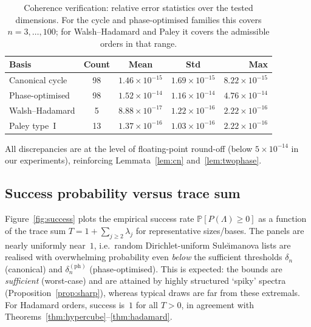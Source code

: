 \documentclass[12pt,fleqn]{amsart}
\renewcommand{\ge}{\geqslant}
\theoremstyle{definition}
\theoremstyle{remark}
\newcommand{\1}{\mathbf{1}}
\begin{document}
\begin{table}[h]
\centering
\caption{Coherence verification: relative error statistics over the tested dimensions. For the cycle and phase-optimised families this covers $n=3,\ldots,100$; for Walsh--Hadamard and Paley it covers the admissible orders in that range.}
\label{tab:coherence_summary}
\begin{tabular}{lcccr}
\toprule
Basis & Count & Mean & Std & Max \\
\midrule
Canonical cycle & 98 & $1.46\times 10^{-15}$ & $1.69\times 10^{-15}$ & $8.22\times 10^{-15}$ \\
Phase-optimised & 98 & $1.52\times 10^{-14}$ & $1.16\times 10^{-14}$ & $4.76\times 10^{-14}$ \\
Walsh--Hadamard & 5 & $8.88\times 10^{-17}$ & $1.22\times 10^{-16}$ & $2.22\times 10^{-16}$ \\
Paley type~I & 13 & $1.37\times 10^{-16}$ & $1.03\times 10^{-16}$ & $2.22\times 10^{-16}$ \\
\bottomrule
\end{tabular}
\end{table}

All discrepancies are at the level of floating-point round-off (below $5\times 10^{-14}$ in our experiments), reinforcing Lemmata~\ref{lem:cn} and~\ref{lem:twophase}.


\subsection{Success probability versus trace sum}
Figure~\ref{fig:success} plots the empirical success rate $\mathbb P[P(\Lambda)\ge0]$ as a function of the trace sum $T=1+\sum_{j\ge2}\lambda_j$ for representative sizes/bases. The panels are nearly uniformly near~$1$, i.e.\ random Dirichlet-uniform Sule\u{\i}manova lists are realised with overwhelming probability even \emph{below} the sufficient thresholds $\delta_n$ (canonical) and $\delta_n^{(\mathrm{ph})}$ (phase-optimised). This is expected: the bounds are \emph{sufficient} (worst-case) and are attained by highly structured `spiky' spectra (Proposition~\ref{prop:sharp}), whereas typical draws are far from these extremals. For Hadamard orders, success is~$1$ for all $T>0$, in agreement with Theorems~\ref{thm:hypercube}--\ref{thm:hadamard}.
\end{document}
